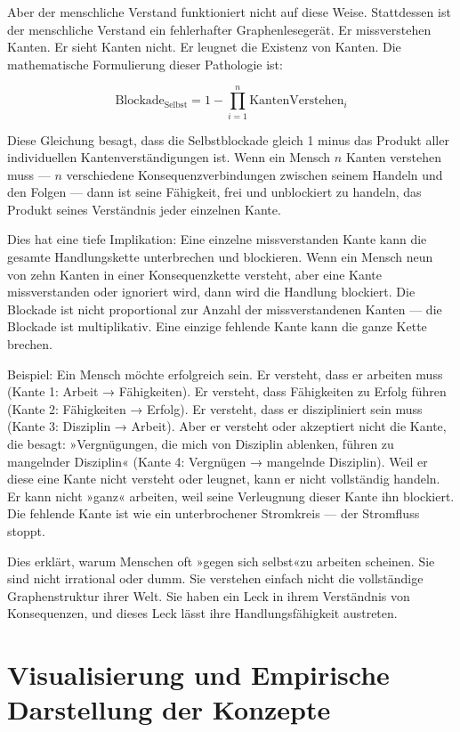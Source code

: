 \documentclass[12pt,a4paper]{article}
\begin{document}
Aber der menschliche Verstand funktioniert nicht auf diese Weise. Stattdessen ist der menschliche Verstand ein fehlerhafter Graphenlesegerät. Er missverstehen Kanten. Er sieht Kanten nicht. Er leugnet die Existenz von Kanten. Die mathematische Formulierung dieser Pathologie ist:

\begin{equation}
\text{Blockade}_{\text{Selbst}} = 1 - \prod_{i=1}^{n} \text{KantenVerstehen}_i
\end{equation}

Diese Gleichung besagt, dass die Selbstblockade gleich 1 minus das Produkt aller individuellen Kantenverständigungen ist. Wenn ein Mensch $n$ Kanten verstehen muss — $n$ verschiedene Konsequenzverbindungen zwischen seinem Handeln und den Folgen — dann ist seine Fähigkeit, frei und unblockiert zu handeln, das Produkt seines Verständnis jeder einzelnen Kante.

Dies hat eine tiefe Implikation: Eine einzelne missverstanden Kante kann die gesamte Handlungskette unterbrechen und blockieren. Wenn ein Mensch neun von zehn Kanten in einer Konsequenzkette versteht, aber eine Kante missverstanden oder ignoriert wird, dann wird die Handlung blockiert. Die Blockade ist nicht proportional zur Anzahl der missverstandenen Kanten — die Blockade ist multiplikativ. Eine einzige fehlende Kante kann die ganze Kette brechen.

Beispiel: Ein Mensch möchte erfolgreich sein. Er versteht, dass er arbeiten muss (Kante 1: Arbeit → Fähigkeiten). Er versteht, dass Fähigkeiten zu Erfolg führen (Kante 2: Fähigkeiten → Erfolg). Er versteht, dass er diszipliniert sein muss (Kante 3: Disziplin → Arbeit). Aber er versteht oder akzeptiert nicht die Kante, die besagt: »Vergnügungen, die mich von Disziplin ablenken, führen zu mangelnder Disziplin« (Kante 4: Vergnügen → mangelnde Disziplin). Weil er diese eine Kante nicht versteht oder leugnet, kann er nicht vollständig handeln. Er kann nicht »ganz« arbeiten, weil seine Verleugnung dieser Kante ihn blockiert. Die fehlende Kante ist wie ein unterbrochener Stromkreis — der Stromfluss stoppt.

Dies erklärt, warum Menschen oft »gegen sich selbst«zu arbeiten scheinen. Sie sind nicht irrational oder dumm. Sie verstehen einfach nicht die vollständige Graphenstruktur ihrer Welt. Sie haben ein Leck in ihrem Verständnis von Konsequenzen, und dieses Leck lässt ihre Handlungsfähigkeit austreten.

\section{Visualisierung und Empirische Darstellung der Konzepte}
\end{document}
